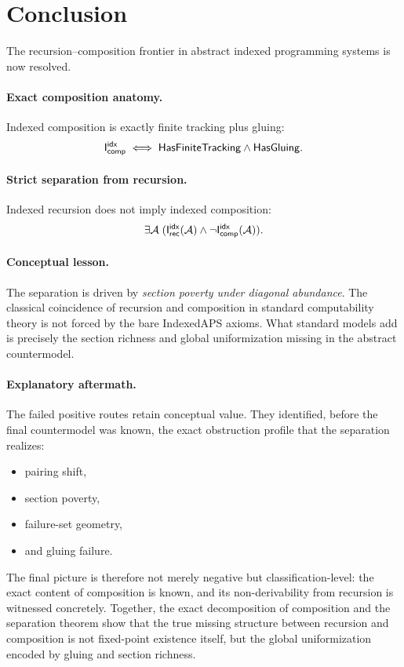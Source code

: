 \documentclass[11pt]{article}
\begin{document}
\section{Conclusion}\label{sec:conclusion}

The recursion--composition frontier in abstract indexed programming systems is now resolved.

\paragraph{Exact composition anatomy.}
Indexed composition is exactly finite tracking plus gluing:
\[
\mathsf{I}_{\mathsf{comp}}^{\mathsf{idx}} \iff \mathsf{HasFiniteTracking} \wedge \mathsf{HasGluing}.
\]

\paragraph{Strict separation from recursion.}
Indexed recursion does not imply indexed composition:
\[
\exists \mathcal{A}\;(\mathsf{I}_{\mathsf{rec}}^{\mathsf{idx}}(\mathcal{A})\wedge \neg \mathsf{I}_{\mathsf{comp}}^{\mathsf{idx}}(\mathcal{A})).
\]

\paragraph{Conceptual lesson.}
The separation is driven by \emph{section poverty under diagonal abundance}.  The classical coincidence of recursion and composition in standard computability theory is not forced by the bare IndexedAPS axioms.  What standard models add is precisely the section richness and global uniformization missing in the abstract countermodel.

\paragraph{Explanatory aftermath.}
The failed positive routes retain conceptual value.  They identified, before the final countermodel was known, the exact obstruction profile that the separation realizes:
\begin{itemize}[leftmargin=2em]
\item pairing shift,
\item section poverty,
\item failure-set geometry,
\item and gluing failure.
\end{itemize}

The final picture is therefore not merely negative but classification-level: the exact content of composition is known, and its non-derivability from recursion is witnessed concretely.  Together, the exact decomposition of composition and the separation theorem show that the true missing structure between recursion and composition is not fixed-point existence itself, but the global uniformization encoded by gluing and section richness.
\end{document}
